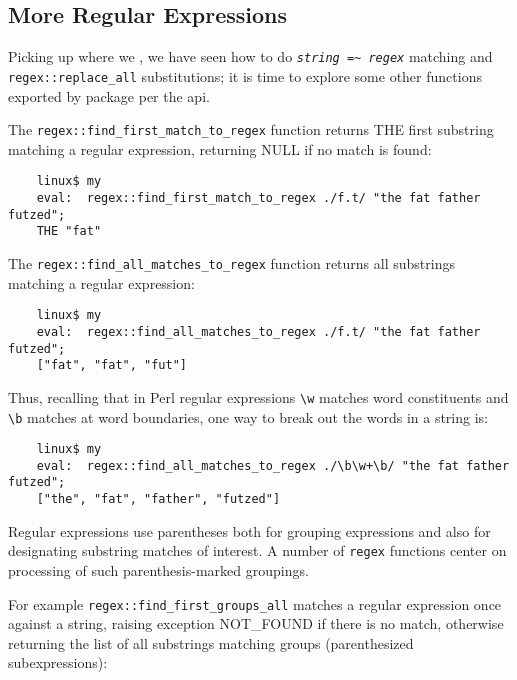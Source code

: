 \cutend*

\subsection{More Regular Expressions}
\label{section:tut:full-monte:regex}

Picking up where we , 
we have seen how to do {\tt {\it string} \verb|=~| {\it regex}} matching and 
{\tt regex::replace\_all} substitutions;  it is time to explore some other 
functions exported by package  per the 
 api.

The {\tt regex::find\_first\_match\_to\_regex} function returns {\sc THE} first substring matching a regular expression, 
returning {\sc NULL} if no match is found:

\begin{verbatim}
    linux$ my
    eval:  regex::find_first_match_to_regex ./f.t/ "the fat father futzed";
    THE "fat"
\end{verbatim}

The {\tt regex::find\_all\_matches\_to\_regex} function returns all substrings matching a regular expression:

\begin{verbatim}
    linux$ my
    eval:  regex::find_all_matches_to_regex ./f.t/ "the fat father futzed";
    ["fat", "fat", "fut"]
\end{verbatim}

Thus, recalling that in Perl regular expressions {\tt \verb|\w|} matches word constituents 
and {\tt \verb|\b|} matches at word boundaries, one way to break out the words in a string is:

\begin{verbatim}
    linux$ my
    eval:  regex::find_all_matches_to_regex ./\b\w+\b/ "the fat father futzed";
    ["the", "fat", "father", "futzed"]
\end{verbatim}

Regular expressions use parentheses both for grouping expressions and also for 
designating substring matches of interest.  A number of {\tt regex} functions 
center on processing of such parenthesis-marked groupings. 

For example {\tt regex::find\_first\_groups\_all} matches a regular expression once against a 
string, raising exception {\sc NOT\_FOUND} if there is no match, otherwise returning the list 
of all substrings matching groups (parenthesized subexpressions):

